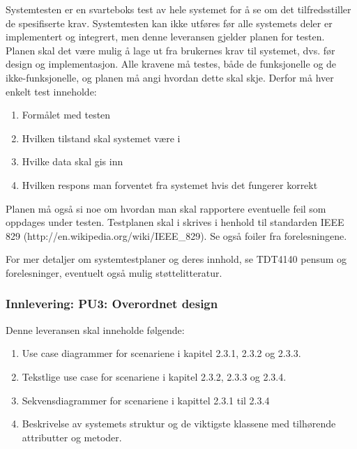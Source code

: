 Systemtesten er en svarteboks test av hele systemet for å se om det tilfredsstiller de spesifiserte krav. Systemtesten kan ikke utføres før alle systemets deler er implementert og integrert, men denne leveransen gjelder planen for testen. Planen skal det være mulig å lage ut fra brukernes krav til systemet, dvs. før design og implementasjon. Alle kravene må testes, både de funksjonelle og de ikke-funksjonelle, og planen må angi hvordan dette skal skje. Derfor må hver enkelt test inneholde:

\begin{enumerate}

\item
Formålet med testen

\item
Hvilken tilstand skal systemet være i

\item
Hvilke data skal gis inn

\item
Hvilken respons man forventet fra systemet hvis det fungerer korrekt

\end{enumerate}

Planen må også si noe om hvordan man skal rapportere eventuelle feil som oppdages under testen. Testplanen skal i skrives i henhold til standarden IEEE 829 (http://en.wikipedia.org/wiki/IEEE\_829). Se også foiler fra forelesningene.

For mer detaljer om systemtestplaner og deres innhold, se TDT4140 pensum og forelesninger, eventuelt også mulig støttelitteratur.

\subsubsection{Innlevering: PU3: Overordnet design}

Denne leveransen skal inneholde følgende:

\begin{enumerate}

\item
Use case diagrammer for scenariene i kapitel 2.3.1, 2.3.2 og 2.3.3.

\item
Tekstlige use case for scenariene i kapitel 2.3.2, 2.3.3 og 2.3.4.

\item
Sekvensdiagrammer for scenariene i kapittel 2.3.1 til 2.3.4

\item
Beskrivelse av systemets struktur og de viktigste klassene med tilhørende attributter og metoder.

\end{enumerate}

